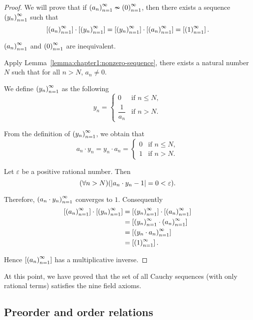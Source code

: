\begin{proof}
    We will prove that if ${\left({a_{n}}\right)}^{\infty}_{n=1}\nsim{\left({0}\right)}^{\infty}_{n=1}$, then there exists a sequence ${\left({y_{n}}\right)}^{\infty}_{n=1}$ such that
    \[
        \left[{{\left({a_{n}}\right)}^{\infty}_{n=1}}\right]\cdot\left[{{\left({y_{n}}\right)}^{\infty}_{n=1}}\right] = \left[{{\left({y_{n}}\right)}^{\infty}_{n=1}}\right]\cdot\left[{{\left({a_{n}}\right)}^{\infty}_{n=1}}\right] = \left[{{\left({1}\right)}^{\infty}_{n=1}}\right].
    \]

    ${\left({a_{n}}\right)}^{\infty}_{n=1}$ and ${\left({0}\right)}^{\infty}_{n=1}$ are inequivalent.

    Apply Lemma~\ref{lemma:chapter1:nonzero-sequence}, there exists a natural number $N$ such that for all $n > N$, $a_{n}\ne 0$.

    We define ${\left({y_{n}}\right)}^{\infty}_{n=1}$ as the following
    \[
        y_{n} = \begin{cases}
            0                & \text{if $n\le N$}, \\
            \dfrac{1}{a_{n}} & \text{if $n > N$}.
        \end{cases}
    \]

    From the definition of ${\left({y_{n}}\right)}^{\infty}_{n=1}$, we obtain that
    \[
        a_{n}\cdot y_{n} = y_{n}\cdot a_{n} = \begin{cases}
            0 & \text{if $n\le N$}, \\
            1 & \text{if $n > N$}.
        \end{cases}
    \]

    Let $\varepsilon$ be a positive rational number. Then
    \[
        (\forall n > N)(\left\vert{a_{n}\cdot y_{n} - 1}\right\vert = 0 < \varepsilon).
    \]

    Therefore, ${\left({a_{n}\cdot y_{n}}\right)}^{\infty}_{n=1}$ converges to $1$. Consequently
    \begin{align*}
        \left[{{\left({a_{n}}\right)}^{\infty}_{n=1}}\right]\cdot\left[{{\left({y_{n}}\right)}^{\infty}_{n=1}}\right] & = \left[{{\left({y_{n}}\right)}^{\infty}_{n=1}}\right]\cdot\left[{{\left({a_{n}}\right)}^{\infty}_{n=1}}\right] \\
                                                    & = \left[{{\left({y_{n}}\right)}^{\infty}_{n=1}\cdot{\left({a_{n}}\right)}^{\infty}_{n=1}}\right]         \\
                                                    & = \left[{{\left({y_{n}\cdot a_{n}}\right)}^{\infty}_{n=1}}\right]              \\
                                                    & = \left[{{\left({1}\right)}^{\infty}_{n=1}}\right].
    \end{align*}

    Hence $\left[{{\left({a_{n}}\right)}^{\infty}_{n=1}}\right]$ has a multiplicative inverse.
\end{proof}

At this point, we have proved that the set of all Cauchy sequences (with only rational terms) satisfies the nine field axioms.

\subsection{Preorder and order relations}

